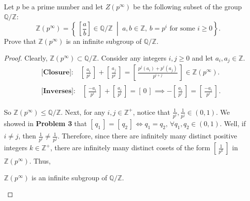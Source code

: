 \documentclass[addpoints,10pt]{exam}
\theoremstyle{plain}
\theoremstyle{definition}
\newtheorem{prob}[thm]{Problem}
\theoremstyle{plain}
\theoremstyle{plain}
\theoremstyle{definition}
\let\oldprob\prob
\let\endoldprob\endprob
\renewenvironment{prob}
  {\begin{singlespace}\oldprob}
  {\endoldprob\end{singlespace}}
\newcommand{\class}[2][]{\ensuremath{\left[\,#2\,\right]_{#1}}}
\newcommand{\QQ}{\ensuremath{\mathbb{Q}}}
\newcommand{\ZZ}{\ensuremath{\mathbb{Z}}}
\begin{document}
\begin{prob}
  Let $p$ be a prime number and let $Z(p^\infty)$ be the following subset of the group $\mathbb{Q}/\mathbb{Z}$:
  \[
  \ZZ(p^\infty)=\left\{\, \left[\frac{a}{b}\right] \in \mathbb{Q}/\mathbb{Z} \;\middle|\; a,b\in\mathbb{Z},\ b=p^i \text{ for some } i \ge 0 \right\}.
  \]
  Prove that $\ZZ(p^\infty)$ is an infinite subgroup of $\mathbb{Q}/\mathbb{Z}$.
\end{prob}

\begin{proof}
    Clearly, $\ZZ(p^{\infty})\subset \QQ/\ZZ$. Consider any integers $i,j\geq 0$ and let $a_{i},a_{j}\in \ZZ$. 
    \begin{align*}
      &\textbf{[Closure]:}\quad\class{\frac{a_{i}}{p^{i}}}+\class{\frac{a_{j}}{p^{i}}}=\class{\frac{p^{j}(a_{i})+p^{i}(a_{j})}{p^{i+j}}}\in \ZZ(p^{\infty}).\\
      &\textbf{[Inverses]:}\quad\class{\frac{-a_{i}}{p^{i}}}+\class{\frac{a_{i}}{p^{i}}}=\class{0}\implies -\class{\frac{a_{i}}{p^{i}}}=\class{\frac{-a_{i}}{p^{i}}}.
    \end{align*}

    So $\ZZ(p^{\infty})\leq \QQ/\ZZ$. Next, for any $i,j\in \ZZ^{+}$, notice that $\frac{1}{p^{i}},\frac{1}{p^{j}}\in (0,1)$. We showed in \textbf{Problem 3} that $\class{q_{1}}=\class{q_{2}}\iff q_{1}=q_{2},\,\forall q_{1},q_{2}\in (0,1)$. Well, if $i\neq j$, then $\frac{1}{p^{i}}\neq \frac{1}{p^{j}}$. Therefore, since there are infinitely many distinct positive integers $k\in \ZZ^{+}$, there are infinitely many distinct cosets of the form $\class{\frac{1}{p^{k}}}$ in $\ZZ(p^\infty)$.
    Thus,
    \begin{center}
    $\ZZ(p^{\infty})$ is an infinite subgroup of $\QQ/\ZZ$.
    \end{center}
\end{proof}

\end{document}
